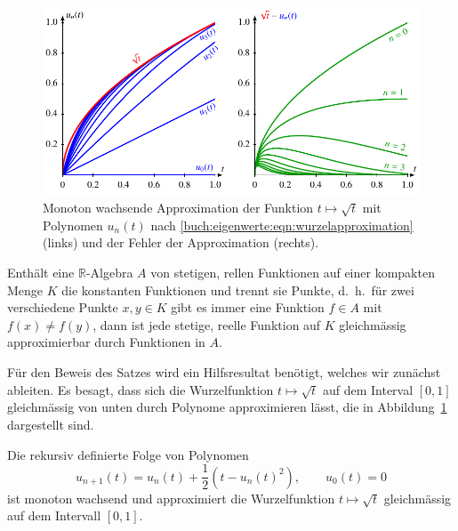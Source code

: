 \begin{figure}
\centering
\includegraphics[width=\textwidth]{chapters/40-eigenwerte/images/wurzelapprox.pdf}
\caption{Monoton wachsende Approximation der Funktion $t\mapsto\sqrt{t}$ mit 
Polynomen $u_n(t)$ nach 
\eqref{buch:eigenwerte:eqn:wurzelapproximation}
(links) und der Fehler der Approximation
(rechts).
\label{buch:eigenwerte:fig:wurzelapproximation}}
\end{figure}

\begin{satz}
\label{buch:satz:stone-weierstrass}
Enthält eine $\mathbb{R}$-Algebra $A$ von stetigen, rellen Funktionen
auf einer kompakten Menge $K$ die konstanten Funktionen und trennt sie
Punkte, d.~h.~für zwei verschiedene Punkte $x,y\in K$ gibt es
immer eine Funktion $f\in A$ mit $f(x)\ne f(y)$, dann ist jede stetige,
reelle Funktion auf $K$ gleichmässig approximierbar durch Funktionen 
in $A$.
\end{satz}

Für den Beweis des Satzes wird ein Hilfsresultat benötigt, welches wir
zunächst ableiten.
Es besagt, dass sich die Wurzelfunktion $t\mapsto\sqrt{t}$
%
auf dem Interval $[0,1]$ gleichmässig
von unten durch Polynome approximieren lässt, die in
Abbildung~\ref{buch:eigenwerte:fig:wurzelapproximation} dargestellt
sind.

\begin{satz}
Die rekursiv definierte Folge von Polynomen
\begin{equation}
u_{n+1}(t)
=
u_n(t) + \frac12(t-u_n(t)^2),
\qquad
u_0(t)=0
\label{buch:eigenwerte:eqn:wurzelapproximation}
\end{equation}
ist monoton wachsend und approximiert die Wurzelfunktion $t\mapsto\sqrt{t}$
gleichmässig auf dem Intervall $[0,1]$.
\end{satz}

